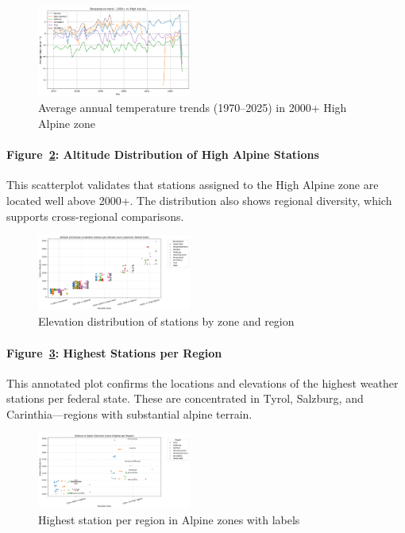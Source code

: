\begin{figure}[ht]
  \centering
    \includegraphics[width=0.45\textwidth]{img/temptrend_highalpine.png}
  \caption{Average annual temperature trends (1970–2025) in 2000+ High Alpine zone}
    \label{fig:temptrend_highalpine}
\end{figure}

\paragraph{Figure~\ref{fig:station_distribution_highalpine}: Altitude Distribution of High Alpine Stations}
This scatterplot validates that stations assigned to the High Alpine zone are located well above 2000+. The distribution also shows regional diversity, which supports cross-regional comparisons.

\begin{figure}[ht]
    \centering
    \includegraphics[width=0.45\textwidth]{img/station_distribution_highalpine.png}
    \caption{Elevation distribution of stations by zone and region}
    \label{fig:station_distribution_highalpine}
\end{figure}

\paragraph{Figure~\ref{fig:highest_stations_labeled}: Highest Stations per Region}
This annotated plot confirms the locations and elevations of the highest weather stations per federal state. These are concentrated in Tyrol, Salzburg, and Carinthia—regions with substantial alpine terrain.

\begin{figure}[ht]
    \centering
    \includegraphics[width=0.45\textwidth]{img/highest_stations_labeled.png}
    \caption{Highest station per region in Alpine zones with labels}
    \label{fig:highest_stations_labeled}
\end{figure}

